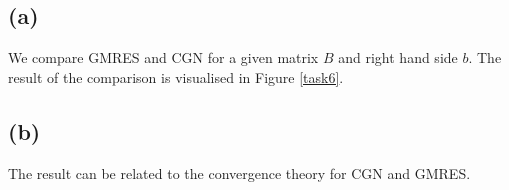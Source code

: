 \subsection{(a)}
We compare GMRES and CGN for a given matrix $B$ and right hand side $b$. The result of the comparison is visualised in Figure \ref{task6}. 

\subsection{(b)}
The result can be related to the convergence theory for CGN and GMRES. 




